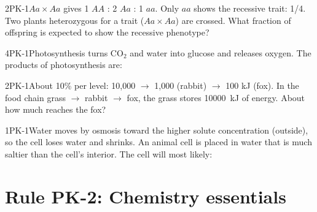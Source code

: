 \documentclass[11pt]{article}
\begin{document}
\begin{q}{2}{PK-1}{$Aa\times Aa$ gives 1 $AA$ : 2 $Aa$ : 1 $aa$. Only $aa$ shows the recessive trait: 1/4.}
Two plants heterozygous for a trait ($Aa \times Aa$) are crossed. What fraction of offspring is expected to show the recessive phenotype?
\end{q}

\begin{q}{4}{PK-1}{Photosynthesis turns CO$_2$ and water into glucose and releases oxygen.}
The products of photosynthesis are:
\end{q}

\begin{q}{2}{PK-1}{About 10\% per level: 10{,}000 $\to$ 1{,}000 (rabbit) $\to$ 100 kJ (fox).}
In the food chain grass $\to$ rabbit $\to$ fox, the grass stores \SI{10000}{\kilo\joule} of energy. About how much reaches the fox?
\end{q}

\begin{q}{1}{PK-1}{Water moves by osmosis toward the higher solute concentration (outside), so the cell loses water and shrinks.}
An animal cell is placed in water that is much saltier than the cell's interior. The cell will most likely:
\end{q}

\section{Rule PK-2: Chemistry essentials}
\end{document}

